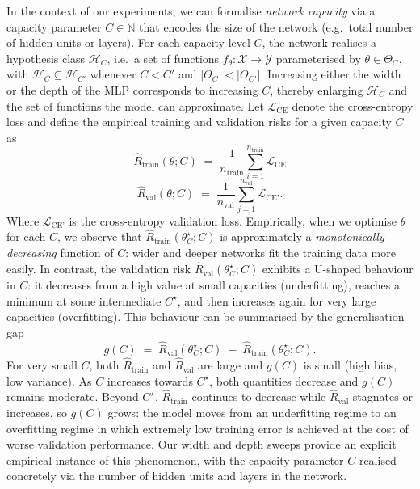 {{In the context of our experiments, we can formalise \emph{network capacity} via a capacity parameter $C \in \mathbb{N}$ that encodes the size of the network \cite{Goodfellow-et-al-2016} (e.g.\ total number of hidden units or layers). For each capacity level $C$, the network realises a hypothesis class $\mathcal{H}_C$, i.e.\ a set of functions $f_\theta : \mathcal{X} \to \mathcal{Y}$ parameterised by $\theta \in \Theta_C$, with $\mathcal{H}_C \subseteq \mathcal{H}_{C'}$ whenever $C < C'$ and $\vert \Theta_C \vert < \vert \Theta_{C'} \vert$.
Increasing either the width or the depth of the MLP corresponds to increasing $C$, thereby enlarging $\mathcal{H}_C$ and the set of functions the model can approximate. Let $\mathcal{L}_{\text{CE}}$ denote the cross-entropy loss and define the empirical training and validation risks for a given capacity $C$ as
\[
\hat R_{\text{train}}(\theta; C)
\;=\;
\frac{1}{n_{\text{train}}} \sum_{i=1}^{n_{\text{train}}} \mathcal{L}_{\text{CE}}
\]
\[ 
\hat R_{\text{val}}(\theta; C)
\;=\;
\frac{1}{n_{\text{val}}} \sum_{j=1}^{n_{\text{val}}} \mathcal{L}_{\text{CE'}}.
\]
Where $\mathcal{L}_{\text{CE'}}$ is the cross-entropy validation loss. Empirically, when we optimise $\theta$ for each $C$, we observe that $\hat R_{\text{train}}(\theta^\star_C; C)$ is approximately a \emph{monotonically decreasing} function of $C$: wider and deeper networks fit the training data more easily. In contrast, the validation risk $\hat R_{\text{val}}(\theta^\star_C; C)$ exhibits a U-shaped behaviour in $C$: it decreases from a high value at small capacities (underfitting), reaches a minimum at some intermediate $C^\star$, and then increases again for very large capacities (overfitting). This behaviour can be summarised by the generalisation gap
\[
g(C) \;=\; \hat R_{\text{val}}(\theta^\star_C; C)
        \;-\; \hat R_{\text{train}}(\theta^\star_C; C).
\]
For very small $C$, both $\hat R_{\text{train}}$ and $\hat R_{\text{val}}$ are large and $g(C)$ is small (high bias, low variance). As $C$ increases towards $C^\star$, both quantities decrease and $g(C)$ remains moderate. Beyond $C^\star$, $\hat R_{\text{train}}$ continues to decrease while $\hat R_{\text{val}}$ stagnates or increases, so $g(C)$ grows: the model moves from an underfitting regime to an overfitting regime in which extremely low training error is achieved at the cost of worse validation performance. Our width and depth sweeps provide an explicit empirical instance of this phenomenon, with the capacity parameter $C$ realised concretely via the number of hidden units and layers in the network.

}}
